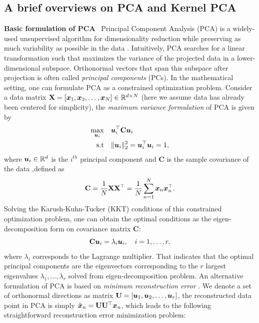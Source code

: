 \subsection{A brief overviews on PCA and Kernel PCA}
\label{subsec-pcakpca}
\textbf{Basic formulation of PCA} \ Principal Component Analysis (PCA) is a widely-used unsupervised algorithm for dimensionality reduction while preserving as much variability as possible in the data \cite{bishopPatternRecognitionMachine2006, karamizadehOverviewPrincipalComponent2013}. Intuitively, PCA searches for a linear transformation such that maximizes the variance of the projected data in a lower-dimensional subspace. Orthonormal vectors that span this subspace after projection is often called \emph{principal components} (PCs). In the mathematical setting, one can formulate PCA as a constrained optimization problem. Consider a data matrix $\mathbf{X} = [\boldsymbol{x}_1,\boldsymbol{x}_2,\dots,\boldsymbol{x}_N]\in \mathbb{R}^{d\times N}$ (here we assume data has already been centered for simplicity), the \emph{maximum variance formulation} \cite{bishopPatternRecognitionMachine2006} of PCA is given by 
\begin{equation}
    \begin{aligned}
        \max_{\boldsymbol{u}_i} & \quad \boldsymbol{u}_i^\top \mathbf{C} \boldsymbol{u}_i \\
        \text{s.t}& \quad  \|\boldsymbol{u}_i\|_2^2=\boldsymbol{u}_i^\top \boldsymbol{u}_i = 1,
    \end{aligned}
\end{equation}
where $\boldsymbol{u}_i \in \mathbb{R}^d$ is the $i^{th}$ principal component and $\mathbf{C}$ is the sample covariance of the data ,defined as 
\begin{equation}
  \mathbf{C} = \frac{1}{N} \mathbf{X}\mathbf{X}^\top = \frac{1}{N} \sum_{n=1}^{N} \boldsymbol{x}_{n}\boldsymbol{x}_{n}^\top.
\end{equation}
Solving the Karush-Kuhn-Tucker (KKT) conditions of this constrained optimization problem, one can obtain the optimal conditions as the eigen-decomposition form on covariance matrix $\mathbf{C}$:
\begin{equation}
    \mathbf{C}\boldsymbol{u}_i = \lambda_i\boldsymbol{u}_i, \quad i=1,\dots, r.
    \label{PCA-solution}
\end{equation}
where $\lambda_i$ corresponds to the Lagrange multiplier. That indicates that the optimal principal components are the eigenvectors corresponding to the $r$ largest eigenvalues $\lambda_1, \dots, \lambda_r$ solved from eigen-decomposition problem. An alternative formulation of PCA is based on \emph{minimum reconstruction error} \cite{bishopPatternRecognitionMachine2006}. We denote a set of orthonormal directions as matrix $\mathbf{U} = [\boldsymbol{u}_1,\boldsymbol{u}_2, \dots, \boldsymbol{u}_r]$, the reconstructed data point in PCA is simply $\tilde{\boldsymbol{x}}_n = \mathbf{U}\mathbf{U}^{\top}\boldsymbol{x}_n$, which leads to the following straightforward reconstruction error minimization problem:
